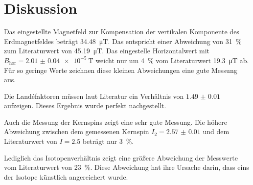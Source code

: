 \section{Diskussion}
\label{sec:Diskussion}
Das eingestellte Magnetfeld zur Kompensation der vertikalen Komponente des Erdmagnetfeldes beträgt \SI{34.48}{\micro\tesla}.
Das entspricht einer Abweichung von \SI{31}{\percent} zum Literaturwert \cite{noaa} von \SI{45.19}{\micro\tesla}.
Das eingestelle Horizontalwert mit $B_{\text{hor}}=\SI{2.01(4)e-5}{\tesla}$ weicht nur um \SI{4}{\percent} vom Literaturwert \SI{19.3}{\micro\tesla} ab.
Für so geringe Werte zeichnen diese kleinen Abweichungen eine gute Messung aus.

Die Landéfaktoren müssen laut Literatur \cite{wang} ein Verhältnis von $\num{1.49(1)}$ aufzeigen.
Dieses Ergebnis wurde perfekt nachgestellt.

Auch die Messung der Kernspins zeigt eine sehr gute Messung.
Die höhere Abweichung zwischen dem gemessenen Kernspin $I_2=\num{2.57(1)}$ und dem Literaturwert von $I=\num{2.5}$ beträgt nur \SI{3}{\percent}.

Lediglich das Isotopenverhältnis zeigt eine größere Abweichung der Messwerte vom Literaturwert von \SI{23}{\percent}.
Diese Abweichung hat ihre Ursache darin, dass eins der Isotope künstlich angereichert wurde.